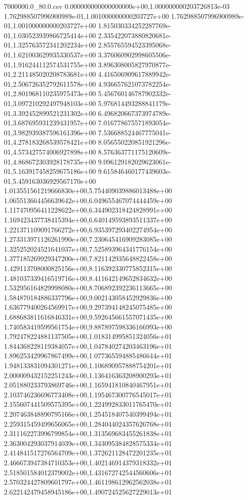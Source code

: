 \begin{filecontents*}{7000000.0_80.0.csv}
0.000000000000000000e+00,1.000000000203726813e-03
1.762988507996900989e-01,1.001000000000203727e+00
1.762988507996900989e-01,1.001000000000203727e+00
1.815030334252287769e-01,1.030523939866725414e+00
2.335422073880820681e-01,1.325763572341202234e+00
2.855765594523395068e-01,1.621003629935330537e+00
3.376060902998605506e-01,1.916244112574531755e+00
3.896308005827970877e-01,2.211485020208783681e+00
4.416506909617889942e-01,2.506726352792611578e+00
4.936657621073782254e-01,2.801968110235975473e+00
5.456760146787902332e-01,3.097210292497948103e+00
5.976814493288841179e-01,3.392452899521231302e+00
6.496820667373974789e-01,3.687695931239431957e+00
7.016778675571893054e-01,3.982939387596161396e+00
7.536688524467775041e-01,4.278183268539578421e+00
8.056550220851921296e-01,4.573427574006927898e+00
8.576363771175120609e-01,4.868672303928178735e+00
9.096129182029623061e-01,5.163917458259675186e+00
9.615846460177439603e-01,5.459163036929567170e+00
1.013551561219666830e+00,5.754409039886013488e+00
1.065513664456639642e+00,6.049655467074444459e+00
1.117470956411228622e+00,6.344902318424828991e+00
1.169423437738415394e+00,6.640149593893511337e+00
1.221371109091766272e+00,6.935397293402274954e+00
1.273313971126261990e+00,7.230645416909283085e+00
1.325252024521641037e+00,7.525893964341776154e+00
1.377185269929347200e+00,7.821142935648822458e+00
1.429113708000825156e+00,8.116392330775852315e+00
1.481037339416519716e+00,8.411642149652834632e+00
1.532956164829998080e+00,8.706892392236113665e+00
1.584870184886337796e+00,9.002143058452929836e+00
1.636779400264569917e+00,9.297394148245075485e+00
1.688683811616846331e+00,9.592645661557071435e+00
1.740583419599561754e+00,9.887897598336166993e+00
1.792478224881137505e+00,1.018314995851324056e+01
1.844368228119384057e+00,1.047840274203463196e+01
1.896253429967867499e+00,1.077365594885486644e+01
1.948133831094301271e+00,1.106890957888754201e+01
2.000009432152251243e+00,1.136416363208900293e+01
2.051880233793869746e+00,1.165941810840467951e+01
2.103746236696773408e+00,1.195467300776545017e+01
2.155607441509575395e+00,1.224992833011765470e+01
2.207463848890795166e+00,1.254518407540399494e+01
2.259315459499656065e+00,1.284044024357626768e+01
2.311162273996799854e+00,1.313569683455261838e+01
2.363004293037914039e+00,1.343095384828575334e+01
2.414841517276564709e+00,1.372621128472201235e+01
2.466673947384710353e+00,1.402146914379318332e+01
2.518501584012379002e+00,1.431672742544560606e+01
2.570324427809601797e+00,1.461198612962562038e+01
2.622142479458945186e+00,1.490724525627229013e+01

\end{filecontents*}
